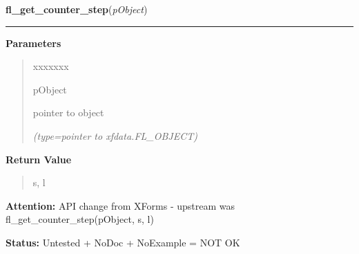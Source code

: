 \hspace{.8\funcindent}\begin{boxedminipage}{\funcwidth}

    \raggedright \textbf{fl\_get\_counter\_step}(\textit{pObject})

    \vspace{-1.5ex}

    \rule{\textwidth}{0.5\fboxrule}
\setlength{\parskip}{2ex}
\setlength{\parskip}{1ex}
      \textbf{Parameters}
      \vspace{-1ex}

      \begin{quote}
        \begin{Ventry}{xxxxxxx}

          \item[pObject]

          pointer to object

            {\it (type=pointer to xfdata.FL\_OBJECT)}

        \end{Ventry}

      \end{quote}

      \textbf{Return Value}
    \vspace{-1ex}

      \begin{quote}
      s, l

      \end{quote}

\textbf{Attention:} API change from XForms - upstream was fl\_get\_counter\_step(pObject, s, l)



\textbf{Status:} Untested + NoDoc + NoExample = NOT OK



    \end{boxedminipage}

    \label{xformslib:library:fl_set_counter_filter}

    \vspace{0.5ex}

